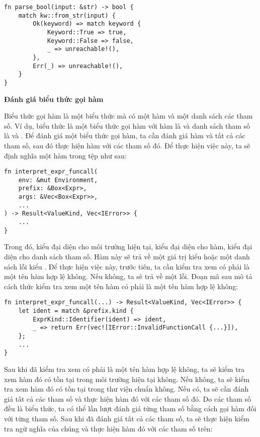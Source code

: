 \begin{lstlisting}[]
fn parse_bool(input: &str) -> bool {
    match kw::from_str(input) {
        Ok(keyword) => match keyword {
            Keyword::True => true,
            Keyword::False => false,
            _ => unreachable!(),
        },
        Err(_) => unreachable!(),
    }
}
\end{lstlisting}

\noindent \textbf{Đánh giá biểu thức gọi hàm}

    Biểu thức gọi hàm là một biểu thức mà có một hàm và một danh sách các tham số. Ví dụ, biểu thức  là một biểu thức gọi hàm với hàm là  và danh sách tham số là  và . Để đánh giá một biểu thức gọi hàm, ta cần đánh giá hàm và tất cả các tham số, sau đó thực hiện hàm với các tham số đó. Để thực hiện việc này, ta sẽ định nghĩa một hàm  trong tệp  như sau:

\begin{lstlisting}[]
fn interpret_expr_funcall(
    env: &mut Environment,
    prefix: &Box<Expr>,
    args: &Vec<Box<Expr>>,
    ...
) -> Result<ValueKind, Vec<IError>> {
    ...
}
\end{lstlisting}

    Trong đó,  kiểu  đại diện cho môi trường hiện tại,  kiểu  đại diện cho hàm,  kiểu  đại diện cho danh sách tham số. Hàm này sẽ trả về một giá trị kiểu  hoặc một danh sách lỗi kiểu . Để thực hiện việc này, trước tiên, ta cần kiểm tra xem  có phải là một tên hàm hợp lệ không. Nếu không, ta sẽ trả về một lỗi. Đoạn mã sau mô tả cách thức kiểm tra xem một tên hàm có phải là một tên hàm hợp lệ không:

\begin{lstlisting}[]
fn interpret_expr_funcall(...) -> Result<ValueKind, Vec<IError>> {
    let ident = match &prefix.kind {
        ExprKind::Identifier(ident) => ident,
        _ => return Err(vec![IError::InvalidFunctionCall {...}]),
    };
    ...
}
\end{lstlisting}

Sau khi đã kiểm tra xem  có phải là một tên hàm hợp lệ không, ta sẽ kiểm tra xem hàm đó có tồn tại trong môi trường hiện tại không. Nếu không, ta sẽ kiểm tra xem hàm đó có tồn tại trong thư viện chuẩn không. Nếu có, ta sẽ cần đánh giá tất cả các tham số và thực hiện hàm đó với các tham số đó. Do các tham số đều là biểu thức, ta có thể lần lượt đánh giá từng tham số bằng cách gọi hàm  đối với từng tham số. Sau khi đã đánh giá tất cả các tham số, ta sẽ thực hiện kiểm tra ngữ nghĩa của chúng và thực hiện hàm đó với các tham số trên:

